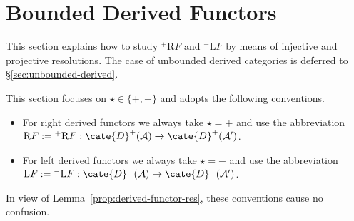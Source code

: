 
\section{Bounded Derived Functors}\label{sec:bounded-derived-functor}
\hypertarget{o014.aljabr2.chapter4.bounded-derived-functors}{ }

This section explains how to study ${}^+\mathrm{R}F$ and
${}^-\mathrm{L}F$ by means of injective and projective resolutions. The case
of unbounded derived categories is deferred to \S\ref{sec:unbounded-derived}.

\begin{convention}
	This section focuses on $\star\in\{+,-\}$ and adopts the following
	conventions.
	\begin{itemize}
		\item For right derived functors we always take $\star=+$ and use the
		abbreviation
		$\mathrm{R}F:={}^+\mathrm{R}F:
		\cate{D}^+(\mathcal{A})\to\cate{D}^+(\mathcal{A}')$.
		\item For left derived functors we always take $\star=-$ and use the
		abbreviation
		$\mathrm{L}F:={}^-\mathrm{L}F:
		\cate{D}^-(\mathcal{A})\to\cate{D}^-(\mathcal{A}')$.
	\end{itemize}
	In view of Lemma~\ref{prop:derived-functor-res}, these conventions cause no
	confusion.
\end{convention}

